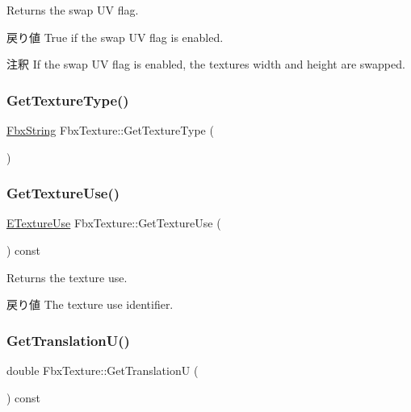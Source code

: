 Returns the swap UV flag. \begin{DoxyReturn}{戻り値}
{\ttfamily True} if the swap UV flag is enabled. 
\end{DoxyReturn}
\begin{DoxyRemark}{注釈}
If the swap UV flag is enabled, the texture\textquotesingle{}s width and height are swapped. 
\end{DoxyRemark}
\mbox{\label{class_fbx_texture_ae671b7102a419f20687774bafee8058e}} 
\subsubsection{\texorpdfstring{Get\+Texture\+Type()}{GetTextureType()}}
{\footnotesize\ttfamily \hyperlink{class_fbx_string}{Fbx\+String} Fbx\+Texture\+::\+Get\+Texture\+Type (\begin{DoxyParamCaption}{ }\end{DoxyParamCaption})}

\mbox{\label{class_fbx_texture_aada6ca015322195cddfa90ccb5274e31}} 
\subsubsection{\texorpdfstring{Get\+Texture\+Use()}{GetTextureUse()}}
{\footnotesize\ttfamily \hyperlink{class_fbx_texture_af034d10e711237dd9ae92a5965787f25}{E\+Texture\+Use} Fbx\+Texture\+::\+Get\+Texture\+Use (\begin{DoxyParamCaption}{ }\end{DoxyParamCaption}) const}

Returns the texture use. \begin{DoxyReturn}{戻り値}
The texture use identifier. 
\end{DoxyReturn}
\mbox{\label{class_fbx_texture_a7785949815ca2cdaa44af41f00c4a3bc}} 
\subsubsection{\texorpdfstring{Get\+Translation\+U()}{GetTranslationU()}}
{\footnotesize\ttfamily double Fbx\+Texture\+::\+Get\+TranslationU (\begin{DoxyParamCaption}{ }\end{DoxyParamCaption}) const}

